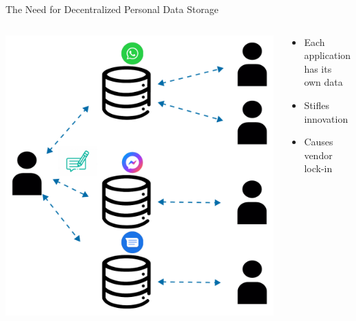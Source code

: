 \begin{frame}{The Need for Decentralized Personal Data Storage}
    \begin{columns}[T] %
        \begin{column}{0.6\textwidth} %
            \includegraphics[width=.85\linewidth]{images/current-bad-message-situation.pdf} %
        \end{column}

        \begin{column}{0.4\textwidth} %
            \begin{itemize}
                \item Each application has its own data
                \item Stifles innovation
                \item Causes vendor lock-in
            \end{itemize}
        \end{column}
    \end{columns}
\end{frame}


